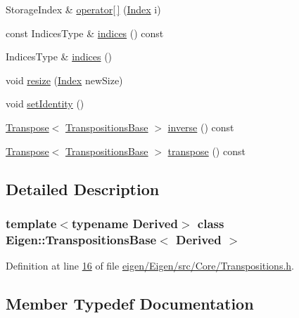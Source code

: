 \begin{DoxyCompactItemize}
\item 
Storage\+Index \& \hyperlink{class_eigen_1_1_transpositions_base_a8951554cfdf4840b4bab9864caecc60a}{operator\mbox{[}$\,$\mbox{]}} (\hyperlink{class_eigen_1_1_transpositions_base_a3f5f06118b419e8e6ccbe49ed5b4c91f}{Index} i)
\item 
const Indices\+Type \& \hyperlink{class_eigen_1_1_transpositions_base_a90acc796341b4627882705d1099e593d}{indices} () const
\item 
Indices\+Type \& \hyperlink{class_eigen_1_1_transpositions_base_a20eda0545eb00e887959f38b3a428a96}{indices} ()
\item 
void \hyperlink{class_eigen_1_1_transpositions_base_a3dfa713d74fc1f9a7e589b3d428f7849}{resize} (\hyperlink{class_eigen_1_1_transpositions_base_a3f5f06118b419e8e6ccbe49ed5b4c91f}{Index} new\+Size)
\item 
void \hyperlink{class_eigen_1_1_transpositions_base_a8da379438691ea694948ea5ae31d305f}{set\+Identity} ()
\item 
\hyperlink{group___core___module_class_eigen_1_1_transpose}{Transpose}$<$ \hyperlink{class_eigen_1_1_transpositions_base}{Transpositions\+Base} $>$ \hyperlink{class_eigen_1_1_transpositions_base_affcac2f2ebcd5a8bf9067e20d3681d78}{inverse} () const
\item 
\hyperlink{group___core___module_class_eigen_1_1_transpose}{Transpose}$<$ \hyperlink{class_eigen_1_1_transpositions_base}{Transpositions\+Base} $>$ \hyperlink{class_eigen_1_1_transpositions_base_a2ddede41421797738fc58ee1074efb8f}{transpose} () const
\end{DoxyCompactItemize}


\subsection{Detailed Description}
\subsubsection*{template$<$typename Derived$>$\newline
class Eigen\+::\+Transpositions\+Base$<$ Derived $>$}



Definition at line \hyperlink{eigen_2_eigen_2src_2_core_2_transpositions_8h_source_l00016}{16} of file \hyperlink{eigen_2_eigen_2src_2_core_2_transpositions_8h_source}{eigen/\+Eigen/src/\+Core/\+Transpositions.\+h}.



\subsection{Member Typedef Documentation}
\mbox{\label{class_eigen_1_1_transpositions_base_a3f5f06118b419e8e6ccbe49ed5b4c91f}} 
